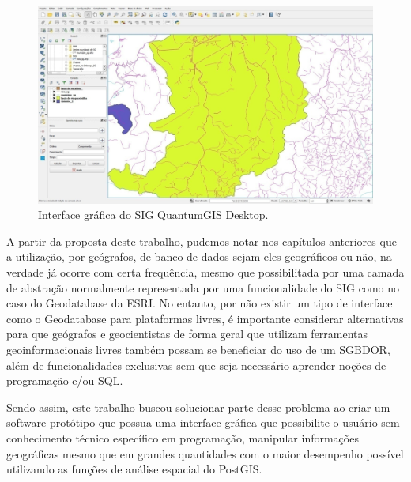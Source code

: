 	\begin{figure}
		\centering
		\includegraphics[width=1\linewidth]{data/qgis_gui}
		\caption{Interface gráfica do SIG QuantumGIS Desktop.}
		\label{fig:qgisgui}
	\end{figure}

A partir da proposta deste trabalho, pudemos notar nos capítulos anteriores que a utilização, por geógrafos, de banco de dados sejam eles geográficos ou não, na verdade já ocorre com certa frequência, mesmo que possibilitada por uma camada de abstração normalmente representada por uma funcionalidade do SIG como no caso do Geodatabase da ESRI. No entanto, por não existir um tipo de interface como o Geodatabase para plataformas livres, é importante considerar alternativas para que geógrafos e geocientistas de forma geral que utilizam ferramentas geoinformacionais livres também possam se beneficiar do uso de um SGBDOR, além de funcionalidades exclusivas sem que seja necessário aprender noções de programação e/ou SQL. 

Sendo assim, este trabalho buscou solucionar parte desse problema ao criar um software protótipo que possua uma interface gráfica que possibilite o usuário sem conhecimento técnico específico em programação, manipular informações geográficas mesmo que em grandes quantidades com o maior desempenho possível utilizando as funções de análise espacial do PostGIS.

